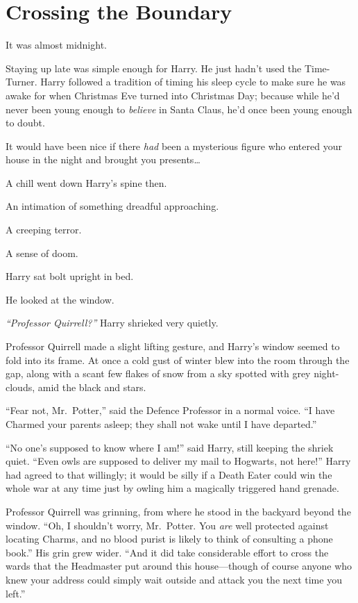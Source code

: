 \chapter{Crossing the Boundary}\label{crossing-the-boundary}

It was almost midnight.

Staying up late was simple enough for Harry. He just hadn't used the
Time-Turner. Harry followed a tradition of timing his sleep cycle to
make sure he was awake for when Christmas Eve turned into Christmas Day;
because while he'd never been young enough to \emph{believe} in Santa
Claus, he'd once been young enough to doubt.

It would have been nice if there \emph{had} been a mysterious figure who
entered your house in the night and brought you presents\ldots{}

A chill went down Harry's spine then.

An intimation of something dreadful approaching.

A creeping terror.

A sense of doom.

Harry sat bolt upright in bed.

He looked at the window.

\emph{``Professor Quirrell?''} Harry shrieked very quietly.

Professor Quirrell made a slight lifting gesture, and Harry's window
seemed to fold into its frame. At once a cold gust of winter blew into
the room through the gap, along with a scant few flakes of snow from a
sky spotted with grey night-clouds, amid the black and stars.

``Fear not, Mr.~Potter,'' said the Defence Professor in a normal voice.
``I have Charmed your parents asleep; they shall not wake until I have
departed.''

``No one's supposed to know where I am!'' said Harry, still keeping the
shriek quiet. ``Even owls are supposed to deliver my mail to Hogwarts,
not here!'' Harry had agreed to that willingly; it would be silly if a
Death Eater could win the whole war at any time just by owling him a
magically triggered hand grenade.

Professor Quirrell was grinning, from where he stood in the backyard
beyond the window. ``Oh, I shouldn't worry, Mr.~Potter. You \emph{are}
well protected against locating Charms, and no blood purist is likely to
think of consulting a phone book.'' His grin grew wider. ``And it did
take considerable effort to cross the wards that the Headmaster put
around this house---though of course anyone who knew your address could
simply wait outside and attack you the next time you left.''


